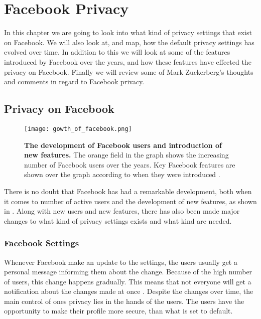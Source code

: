 \chapter{Facebook Privacy}
\label{chp:defaultprivacysettings} 

In this chapter we are going to look into what kind of privacy settings that exist on Facebook. We will also look at, and map, how the default privacy settings has evolved over time. In addition to this we will look at some of the features introduced by Facebook over the years, and how these features have effected the privacy on Facebook. Finally we will review some of Mark Zuckerberg's  thoughts and comments in regard to Facebook privacy. 


\section{Privacy on Facebook}\label{sec:privacy_on_facebook}

\begin{figure}[b]
\centering
\texttt{[image: gowth\_of\_facebook.png]}
\caption[The development of Facebook users and introduction of new features]{\textbf{The development of Facebook users and introduction of new features.} The orange field in the graph shows the increasing number of Facebook users over the years. Key Facebook features are shown over the graph according to when they were introduced \cite{BBCFacebookGrowth}.} 
\label{fig:growth_of_facebook}
\end{figure}

There is no doubt that Facebook has had a remarkable development, both when it comes to number of active users and the development of new features, as shown in . Along with new users and new features, there has also been made major changes to what kind of privacy settings exists and what kind are needed. 


\subsection{Facebook Settings}
Whenever Facebook make an update to the settings, the users usually get a personal message informing them about the change. Because of the high number of users, this change happens gradually. This means that not everyone will get a notification about the changes made at once \cite{settingschangingagain}. Despite the changes over time, the main control of ones privacy lies in the hands of the users. The users have the opportunity to make their profile more secure, than what is set to default. 

